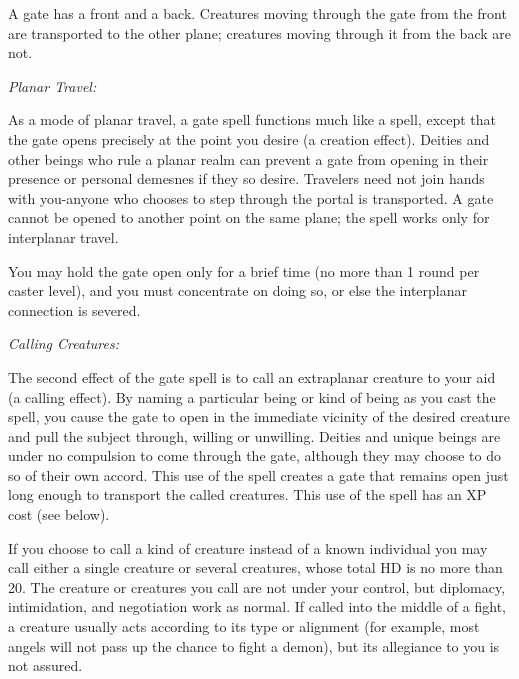 A gate has a front and a back. Creatures moving through the gate from the front are transported to the other plane; creatures moving through it from the back are not.
\begin{list}{}{\leftmargin=1em}
\item \emph{Planar Travel:}

As a mode of planar travel, a gate spell functions much like a  spell, 
except that the gate opens precisely at the point you desire (a creation effect). 
Deities and other beings who rule a planar realm can prevent a gate from opening in their presence or personal demesnes if they so desire. 
Travelers need not join hands with you-anyone who chooses to step through the portal is transported. 
A gate cannot be opened to another point on the same plane; the spell works only for interplanar travel.

You may hold the gate open only for a brief time (no more than 1 round per caster level), 
and you must concentrate on doing so, or else the interplanar connection is severed.
\item \emph{Calling Creatures:}

The second effect of the gate spell is to call an extraplanar creature to your aid (a calling effect). 
By naming a particular being or kind of being as you cast the spell, 
you cause the gate to open in the immediate vicinity of the desired creature and pull the subject through, 
willing or unwilling. Deities and unique beings are under no compulsion to come through the gate, although they may choose to do so of their own accord. 
This use of the spell creates a gate that remains open just long enough to transport the called creatures. This use of the spell has an XP cost (see below).

If you choose to call a kind of creature instead of a known individual you may call either a single creature or several creatures, whose total HD is no more than 20.
The creature or creatures you call are not under your control, but diplomacy, intimidation, and negotiation work as normal. 
If called into the middle of a fight, a creature usually acts according to its type or alignment
(for example, most angels will not pass up the chance to fight a demon), but its allegiance to you is not assured.


\end{list}
